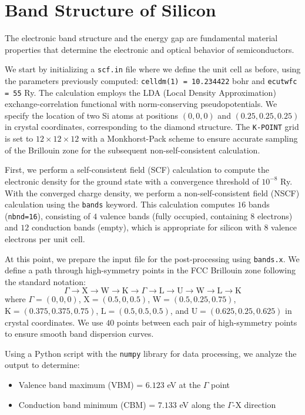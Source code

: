 \documentclass{article}
\begin{document}
\section{Band Structure of Silicon}

The electronic band structure and the energy gap are fundamental material properties that determine the electronic and optical behavior of semiconductors.

We start by initializing a \verb|scf.in| file where we define the unit cell as before, using the parameters previously computed: \verb|celldm(1) = 10.234422| bohr and \verb|ecutwfc = 55| Ry. The calculation employs the LDA (Local Density Approximation) exchange-correlation functional with norm-conserving pseudopotentials. We specify the location of two Si atoms at positions $(0,0,0)$ and $(0.25,0.25,0.25)$ in crystal coordinates, corresponding to the diamond structure. The \verb|K-POINT| grid is set to $12\times12\times12$ with a Monkhorst-Pack scheme to ensure accurate sampling of the Brillouin zone for the subsequent non-self-consistent calculation.

First, we perform a self-consistent field (SCF) calculation to compute the electronic density for the ground state with a convergence threshold of $10^{-8}$ Ry. With the converged charge density, we perform a non-self-consistent field (NSCF) calculation using the \verb|bands| keyword. This calculation computes $16$ bands (\verb|nbnd=16|), consisting of $4$ valence bands (fully occupied, containing 8 electrons) and $12$ conduction bands (empty), which is appropriate for silicon with $8$ valence electrons per unit cell.

At this point, we prepare the input file for the post-processing using \verb|bands.x|. We define a path through high-symmetry points in the FCC Brillouin zone following the standard notation:
$$
\Gamma \rightarrow \text{X} \rightarrow \text{W} \rightarrow \text{K} \rightarrow \Gamma \rightarrow \text{L} \rightarrow \text{U} \rightarrow \text{W} \rightarrow \text{L} \rightarrow \text{K}
$$
where $\Gamma = (0,0,0)$, $\text{X} = (0.5,0,0.5)$, $\text{W} = (0.5,0.25,0.75)$, $\text{K} = (0.375,0.375,0.75)$, $\text{L} = (0.5,0.5,0.5)$, and $\text{U} = (0.625,0.25,0.625)$ in crystal coordinates. We use $40$ points between each pair of high-symmetry points to ensure smooth band dispersion curves.

Using a Python script with the \verb|numpy| library for data processing, we analyze the output to determine:
\begin{itemize}
    \item Valence band maximum (VBM) = $6.123$ eV at the $\Gamma$ point
    \item Conduction band minimum (CBM) = $7.133$ eV along the $\Gamma$-X direction
\end{itemize}
\end{document}
